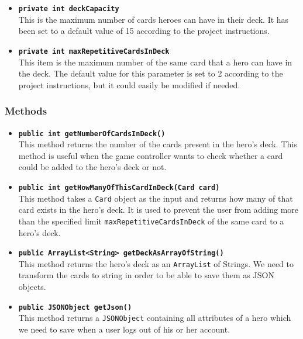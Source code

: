\documentclass[a4paper]{article}
\begin{document}
\begin{itemize}
	\item \textbf{\texttt{private int deckCapacity}}\\
	This is the maximum number of cards heroes can have in their deck. It has been set to a default value of 15 according to the project instructions.
	
	\item \textbf{\texttt{private int maxRepetitiveCardsInDeck}}\\
	This item is the maximum number of the same card that a hero can have in the deck. The default value for this parameter is set to 2 according to the project instructions, but it could easily be modified if needed.	
\end{itemize}

\subsubsection{Methods}


\begin{itemize}
	\item \textbf{\texttt{public int getNumberOfCardsInDeck()}}\\
	This method returns the number of the cards present in the hero's deck. This method is useful when the game controller wants to check whether a card could be added to the hero's deck or not.
	
	\item \textbf{\texttt{public int getHowManyOfThisCardInDeck(Card card)}}\\
	This method takes a \texttt{Card} object as the input and returns how many of that card exists in the hero's deck. It is used to prevent the user from adding more than the specified limit \texttt{maxRepetitiveCardsInDeck} of the same card to a hero's deck.
	
	\item \textbf{\texttt{public ArrayList<String> getDeckAsArrayOfString()}}\\
	This method returns the hero's deck as an \texttt{ArrayList} of Strings. We need to transform the cards to string in order to be able to save them as JSON objects.
	
	\item \textbf{\texttt{public JSONObject getJson()}}\\
	This method returns a \texttt{JSONObject} containing all attributes of a hero which we need to save when a user logs out of his or her account.
	
\end{itemize}
\end{document}
